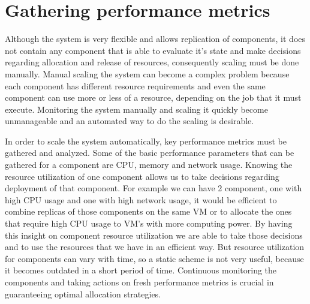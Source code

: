 \section{Gathering performance metrics}
Although the system is very flexible and allows replication of components, it does not contain any component that is able to evaluate it's state and make decisions regarding allocation and release of resources, consequently scaling must be done manually. Manual scaling the system can become a complex problem because each component has different resource requirements and even the same component can use more or less of a resource, depending on the job that it must execute. Monitoring the system manually and scaling it quickly become unmanageable and an automated way to do the scaling is desirable. 

In order to scale the system automatically, key performance metrics must be gathered and analyzed. Some of the basic performance parameters that can be gathered for a component are CPU, memory and network usage. Knowing the resource utilization of one component allows us to take decisions regarding deployment of that component. For example we can have 2 component, one with high CPU usage and one with high network usage, it would be efficient to combine replicas of those components on the same VM or to allocate the ones that require high CPU usage to VM's with more computing power. By having this insight on component resource utilization we are able to take those decisions and to use the resources that we have in an efficient way. But resource utilization for components can vary with time, so a static scheme is not very useful, because it becomes outdated in a short period of time. Continuous monitoring the components and taking actions on fresh performance metrics is crucial in guaranteeing optimal allocation strategies.

